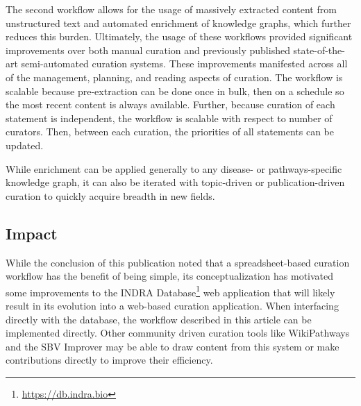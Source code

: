 The second workflow allows for the usage of massively extracted content from unstructured text and automated enrichment of knowledge graphs, which further reduces this burden.
Ultimately, the usage of these workflows provided significant improvements over both manual curation and previously published state-of-the-art semi-automated curation systems.
These improvements manifested across all of the management, planning, and reading aspects of curation.
The workflow is scalable because pre-extraction can be done once in bulk, then on a schedule so the most recent content is always available.
Further, because curation of each statement is independent, the workflow is scalable with respect to number of curators.
Then, between each curation, the priorities of all statements can be updated.

While enrichment can be applied generally to any disease- or pathways-specific knowledge graph, it can also be iterated with topic-driven or publication-driven curation to quickly acquire breadth in new fields.

\subsection*{Impact}

While the conclusion of this publication noted that a spreadsheet-based curation workflow has the benefit of being simple, its conceptualization has motivated some improvements to the INDRA Database\footnote{\url{https://db.indra.bio}} web application that will likely result in its evolution into a web-based curation application.
When interfacing directly with the database, the workflow described in this article can be implemented directly.
Other community driven curation tools like WikiPathways and the SBV Improver may be able to draw content from this system or make contributions directly to improve their efficiency.
